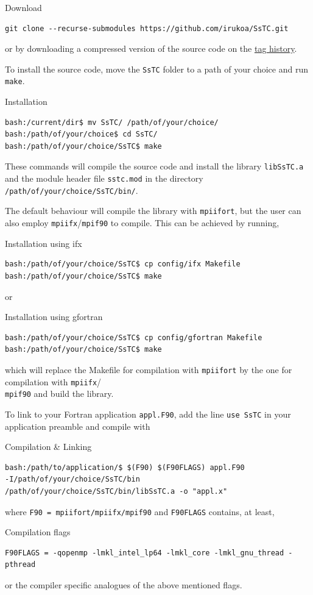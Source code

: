 \documentclass[10pt,a4paper]{article}
\begin{document}
\begin{codebox}{Download}
\begin{verbatim}
git clone --recurse-submodules https://github.com/irukoa/SsTC.git
\end{verbatim}
\end{codebox}
or by downloading a compressed version of the source code on the \href{https://github.com/irukoa/SsTC/tags}{tag history}.

To install the source code, move the \verb|SsTC| folder to a path of your choice and run \verb|make|.
\begin{codebox}{Installation}
\begin{verbatim}
bash:/current/dir$ mv SsTC/ /path/of/your/choice/
bash:/path/of/your/choice$ cd SsTC/
bash:/path/of/your/choice/SsTC$ make
\end{verbatim}
\end{codebox}
These commands will compile the source code and install the library \verb|libSsTC.a| and the module header file \verb|sstc.mod| in the directory \verb|/path/of/your/choice/SsTC/bin/|.

The default behaviour will compile the library with \verb|mpiifort|, but the user can also employ \verb|mpiifx|/\verb|mpif90| to compile. This can be achieved by running,
\begin{codebox}{Installation using ifx}
\begin{verbatim}
bash:/path/of/your/choice/SsTC$ cp config/ifx Makefile
bash:/path/of/your/choice/SsTC$ make
\end{verbatim}
\end{codebox}
or
\begin{codebox}{Installation using gfortran}
\begin{verbatim}
bash:/path/of/your/choice/SsTC$ cp config/gfortran Makefile
bash:/path/of/your/choice/SsTC$ make
\end{verbatim}
\end{codebox}
which will replace the Makefile for compilation with \verb|mpiifort| by the one for compilation with \verb|mpiifx|/\\ \verb|mpif90| and build the library.

To link to your Fortran application \verb|appl.F90|, add the line \verb|use SsTC| in your application preamble and compile with
\begin{codebox}{Compilation \& Linking}
\begin{verbatim}
bash:/path/to/application/$ $(F90) $(F90FLAGS) appl.F90
-I/path/of/your/choice/SsTC/bin
/path/of/your/choice/SsTC/bin/libSsTC.a -o "appl.x"
\end{verbatim}
\end{codebox}
where \verb|F90 = mpiifort/mpiifx/mpif90| and \verb|F90FLAGS| contains, at least,
\begin{codebox}{Compilation flags}
\begin{verbatim}
F90FLAGS = -qopenmp -lmkl_intel_lp64 -lmkl_core -lmkl_gnu_thread -pthread
\end{verbatim}
\end{codebox}
or the compiler specific analogues of the above mentioned flags.
\end{document}
